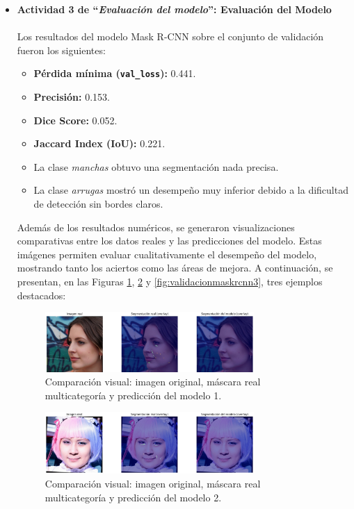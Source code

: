\begin{enumerate}
\begin{itemize}
    \item \textbf{Actividad 3 de “\textit{Evaluación del modelo}”: Evaluación del Modelo} \\
    \\
    Los resultados del modelo Mask R-CNN sobre el conjunto de validación fueron los siguientes:
    \begin{itemize}
      \item \textbf{Pérdida mínima (\texttt{val\_loss}):} 0.441.
      \item \textbf{Precisión:} 0.153.
      \item \textbf{Dice Score:} 0.052.
      \item \textbf{Jaccard Index (IoU):} 0.221.
      \item La clase \emph{manchas} obtuvo una segmentación nada precisa.
      \item La clase \emph{arrugas} mostró un desempeño muy inferior debido a la dificultad de detección sin bordes claros.
    \end{itemize}
  
    Además de los resultados numéricos, se generaron visualizaciones comparativas entre los datos reales y las predicciones del modelo. Estas imágenes permiten evaluar cualitativamente el desempeño del modelo, mostrando tanto los aciertos como las áreas de mejora. A continuación, se presentan, en las Figuras \ref{fig:validacionmaskrcnn1}, \ref{fig:validacionmaskrcnn2} y \ref{fig:validacionmaskrcnn3}, tres ejemplos destacados:
  
    \vspace{0.5cm}
  
    \begin{figure}[H]
      \centering
      \includegraphics[width=0.75\textwidth]{4/figures/maskrcnn1.png}
      \caption{Comparación visual: imagen original, máscara real multicategoría y predicción del modelo 1.}
      \label{fig:validacionmaskrcnn1}
    \end{figure}
  
    \begin{figure}[H]
      \centering
      \includegraphics[width=0.75\textwidth]{4/figures/maskrcnn2.png}
      \caption{Comparación visual: imagen original, máscara real multicategoría y predicción del modelo 2.}
      \label{fig:validacionmaskrcnn2}
    \end{figure}
  

\end{itemize}
\end{enumerate}
